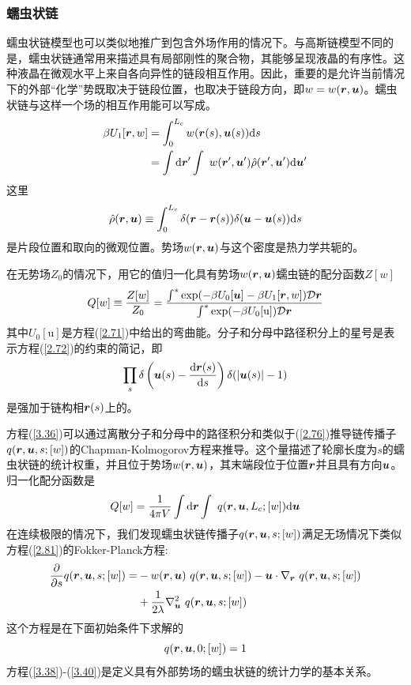 \subsubsection{蠕虫状链}
蠕虫状链模型也可以类似地推广到包含外场作用的情况下。与高斯链模型不同的是，蠕虫状链通常用来描述具有局部刚性的聚合物，其能够呈现液晶的有序性。这种液晶在微观水平上来自各向异性的链段相互作用。因此，重要的是允许当前情况下的外部“化学”势既取决于链段位置，也取决于链段方向，即$w=w(\bm{r},\bm{u})$。蠕虫状链与这样一个场的相互作用能可以写成。
\begin{equation}\label{3.34}
\begin{aligned}
\beta U_1[\bm{r},w]&=\int_0^{L_c}w(\bm{r}(s),\bm{u}(s))\mathrm{d}s\\
&=\int\mathrm{d}\bm{r}'\int~w(\bm{r}',\bm{u}')\hat{\rho}(\bm{r}',\bm{u}')\mathrm{d}\bm{u}'
\end{aligned}
\end{equation}
这里
\begin{equation}\label{3.35}
\hat{\rho}(\bm{r},\bm{u})\equiv\int_0^{L_c}\delta(\bm{r}-\bm{r}(s))\delta(\bm{u}-\bm{u}(s))\mathrm{d}s
\end{equation}
是片段位置和取向的微观位置。势场$w(\bm{r},\bm{u})$与这个密度是热力学共轭的。

在无势场$Z_0$的情况下，用它的值归一化具有势场$w(\bm{r},\bm{u})$蠕虫链的配分函数$Z[w]$
\begin{equation}\label{3.36}
Q[w]\equiv\frac{Z[w]}{Z_0}=\frac{\int^*\exp(-\beta U_0[\bm{u}]-\beta U_1[\bm{r},w])\mathcal{D}\bm{r}}{\int^*\exp(-\beta U_0[\mathrm{u}])\mathcal{D}\bm{r}}
\end{equation}
其中$U_0[\mathrm{u}]$是方程(\ref{2.71})中给出的弯曲能。分子和分母中路径积分上的星号是表示方程(\ref{2.72})的约束的简记，即
\begin{equation}\label{3.37}
\prod\limits_s\delta\left(\bm{u}(s)-\frac{\mathrm{d}\bm{r}(s)}{\mathrm{d}s}\right)\delta(\left|\bm{u}(s)\right|-1)
\end{equation}
是强加于链构相$\bm{r}(s)$上的。

方程(\ref{3.36})可以通过离散分子和分母中的路径积分和类似于(\ref{2.76})推导链传播子$q(\bm{r},\bm{u},s;[w])$的Chapman-Kolmogorov方程来推导。这个量描述了轮廓长度为$s$的蠕虫状链的统计权重，并且位于势场$w(\bm{r},\bm{u})$，其末端段位于位置$\bm{r}$并且具有方向$\bm{u}$。归一化配分函数是
\begin{equation}\label{3.38}
Q[w]=\frac{1}{4\pi V}\int\mathrm{d}\bm{r}\int~q(\bm{r},\bm{u},L_c;[w])\mathrm{d}\bm{u}
\end{equation}
在连续极限的情况下，我们发现蠕虫状链传播子$q(\bm{r},\bm{u},s;[w])$满足无场情况下类似方程(\ref{2.81})的Fokker-Planck方程:
\begin{equation}\label{3.39}
\begin{aligned}
\frac{\partial}{\partial s}q(\bm{r},\bm{u},s;[w])=&-w(\bm{r},\bm{u})~q(\bm{r},\bm{u},s;[w])-\bm{u}\cdot\nabla_{\bm{r}}~q(\bm{r},\bm{u},s;[w])\\
&+\frac{1}{2\lambda}\nabla_{\bm{u}}^2~q(\bm{r},\bm{u},s;[w])
\end{aligned}
\end{equation}
这个方程是在下面初始条件下求解的
\begin{equation}\label{3.40}
q(\bm{r},\bm{u},0;[w])=1
\end{equation}
方程(\ref{3.38})-(\ref{3.40})是定义具有外部势场的蠕虫状链的统计力学的基本关系。

